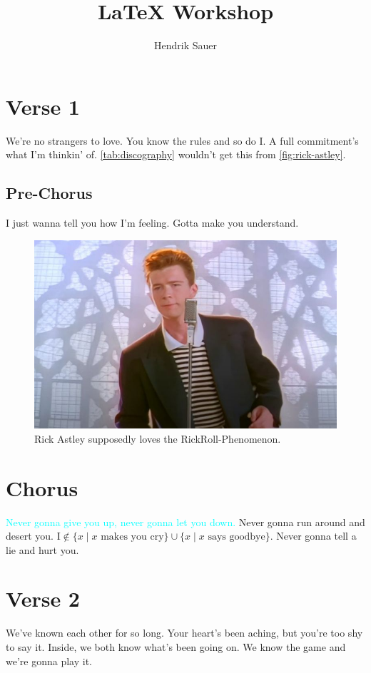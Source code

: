 \documentclass{article}
\title{\LaTeX{} Workshop}
\author{Hendrik Sauer }
\begin{document}
\maketitle

\section{Verse 1}

We're no strangers to love.
You know the rules and so do I.
A full commitment's what I'm thinkin' of.
\autoref{tab:discography} wouldn't get this from \autoref{fig:rick-astley}.

\subsection{Pre-Chorus}

I just wanna tell you how I'm feeling.
Gotta make you understand.

\begin{figure}
    \centering
    \includegraphics[width=0.5\linewidth]{rick-astley.jpg}
    \caption{Rick Astley supposedly loves the RickRoll-Phenomenon.}
    \label{fig:rick-astley}
\end{figure}

\section{Chorus}

\textcolor{cyan}{Never gonna give you up, never gonna let you down.}
Never gonna run around and desert you.
\(\text{I} \notin \{x \mid x \text{ makes you cry}\} \cup \{x \mid x \text{ says goodbye}\}\).
Never gonna tell a lie and hurt you.

\section{Verse 2}

We've known each other for so long.
Your heart's been aching, but you're too shy to say it.
Inside, we both know what's been going on.
We know the game and we're gonna play it.
\end{document}

